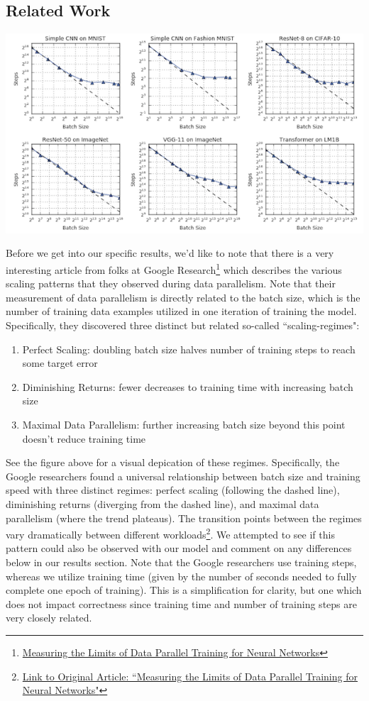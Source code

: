 \documentclass{article}
\begin{document}
\subsection{Related Work}

\includegraphics[scale = 0.75]{google}

Before we get into our specific results, we'd like to note that there is a very interesting article from folks at Google Research\footnote{\href{https://ai.googleblog.com/2019/03/measuring-limits-of-data-parallel.html}{Measuring the Limits of Data Parallel Training for Neural Networks}} which describes the various scaling patterns that they observed during data parallelism. Note that their measurement of data parallelism is directly related to the batch size, which is the number of training data examples utilized in one iteration of training the model. Specifically, they discovered three distinct but related so-called ``scaling-regimes":
\begin{enumerate}
  \item Perfect Scaling: doubling batch size halves number of training steps to reach some target error
  \item Diminishing Returns: fewer decreases to training time with increasing batch size
  \item Maximal Data Parallelism: further increasing batch size beyond this point doesn’t reduce training time
\end{enumerate}

\noindent See the figure above for a visual depication of these regimes. Specifically, the Google researchers found a universal relationship between batch size and training speed with three distinct regimes: perfect scaling (following the dashed line), diminishing returns (diverging from the dashed line), and maximal data parallelism (where the trend plateaus). The transition points between the regimes vary dramatically between different workloads\footnote{\href{https://ai.googleblog.com/2019/03/measuring-limits-of-data-parallel.html}{Link to Original Article: ``Measuring the Limits of Data Parallel Training for Neural Networks"}}. We attempted to see if this pattern could also be observed with our model and comment on any differences below in our results section. Note that the Google researchers use training steps, whereas we utilize training time (given by the number of seconds needed to fully complete one epoch of training). This is a simplification for clarity, but one which does not impact correctness since training time and number of training steps are very closely related.
\end{document}
